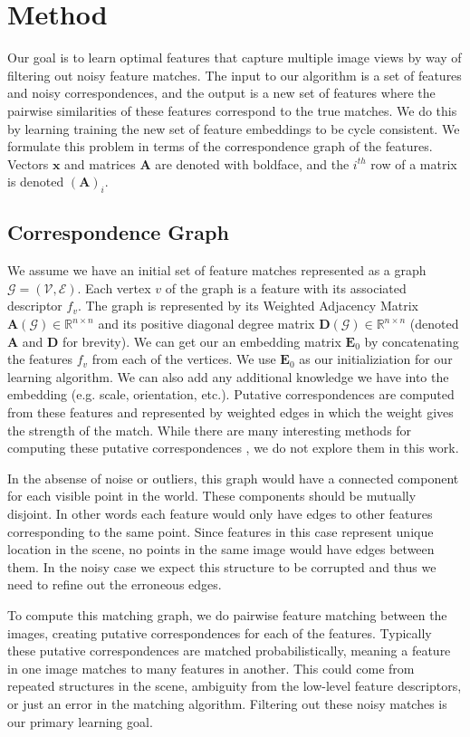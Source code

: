 \documentclass[10pt,twocolumn,letterpaper]{article}
\newcommand{\bR}{\mathbb{R}}
\newcommand{\mat}[1]{\mathbf{#1}}
\begin{document}
\section{Method}
Our goal is to learn optimal features that capture multiple image views by way of filtering out noisy feature matches.
The input to our algorithm is a set of features and noisy correspondences, and the output is a new set of features where the pairwise similarities of these features correspond to the true matches.
We do this by learning training the new set of feature embeddings to be cycle consistent.
We formulate this problem in terms of the correspondence graph of the features.
Vectors $\mat{x}$ and matrices $\mat{A}$ are denoted with boldface, and the $i^{th}$ row of a matrix is denoted $(\mat{A})_i$.
\subsection{Correspondence Graph}
We assume we have an initial set of feature matches represented as a graph $\mathcal{G} = (\mathcal{V}, \mathcal{E})$.
Each vertex $v$ of the graph is a feature with its associated descriptor $f_v$. 
The graph is represented by its Weighted Adjacency Matrix $\mat{A}(\mathcal{G}) \in \bR^{n \times n}$ and its positive diagonal degree matrix $\mat{D}(\mathcal{G}) \in \bR^{n \times n}$ (denoted $\mat{A}$ and $\mat{D}$ for brevity).
We can get our an embedding matrix $\mat{E}_0$ by concatenating the features $f_v$ from each of the vertices.
We use $\mat{E}_0$ as our initializiation for our learning algorithm.
We can also add any additional knowledge we have into the embedding (e.g. scale, orientation, etc.).
Putative correspondences are computed from these features and represented by weighted edges in which the weight gives the strength of the match.
While there are many interesting methods for computing these putative correspondences \cite{suh2015subgraph, yi2018learning}, we do not explore them in this work.

In the absense of noise or outliers, this graph would have a connected component for each visible point in the world.
These components should be mutually disjoint. 
In other words each feature would only have edges to other features corresponding to the same point.
Since features in this case represent unique location in the scene, no points in the same image would have edges between them.
In the noisy case we expect this structure to be corrupted and thus we need to refine out the erroneous edges.

To compute this matching graph, we do pairwise feature matching between the images, creating putative correspondences for each of the features.
Typically these putative correspondences are matched probabilistically, meaning a feature in one image matches to many features in another.
This could come from repeated structures in the scene, ambiguity from the low-level feature descriptors, or just an error in the matching algorithm.
Filtering out these noisy matches is our primary learning goal.
\end{document}
